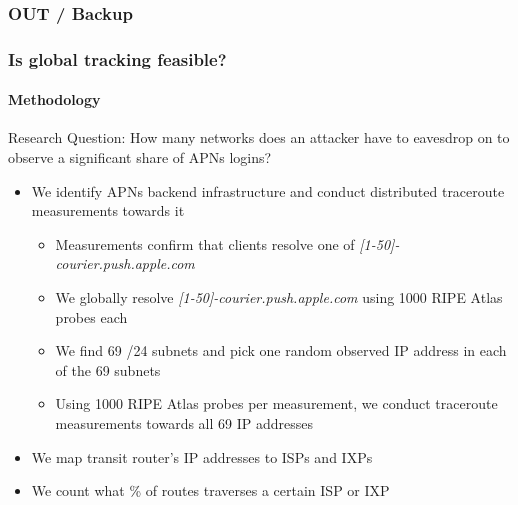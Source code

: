
\begin{frame}
\frametitle{OUT / Backup}
\end{frame}
\clearpage


\begin{frame}
	\frametitle{Is global tracking feasible?}
	\framesubtitle{Methodology}
	Research Question: How many networks does an attacker have to eavesdrop on to observe a significant share of APNs logins?
	\begin{itemize}
		\item We identify APNs backend infrastructure and conduct distributed traceroute \\ measurements towards it
		\begin{itemize}
		\item Measurements confirm that clients resolve one of \textit{[1-50]-courier.push.apple.com}
		\item We globally resolve \textit{[1-50]-courier.push.apple.com} using 1000 RIPE Atlas probes each
		\item We find 69 /24 subnets and pick one random observed IP address in each of the 69 subnets
		\item Using 1000 RIPE Atlas probes per measurement, we conduct traceroute measurements towards all 69 IP addresses
		\end{itemize}
		\item We map transit router's IP addresses to ISPs and IXPs 
		\item We count what \% of routes traverses a certain ISP or IXP
	\end{itemize}	
\end{frame}

